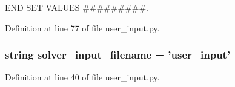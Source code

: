 E\-N\-D S\-E\-T V\-A\-L\-U\-E\-S \#\#\#\#\#\#\#\#\#. 



Definition at line 77 of file user\-\_\-input.\-py.

\hypertarget{namespaceuser__input_a92a75cd7aa57960ca65957a1baa06d77}{
\subsubsection[{solver\-\_\-input\-\_\-filename}]{\setlength{\rightskip}{0pt plus 5cm}string solver\-\_\-input\-\_\-filename = 'user\-\_\-input'}}\label{namespaceuser__input_a92a75cd7aa57960ca65957a1baa06d77}


Definition at line 40 of file user\-\_\-input.\-py.


